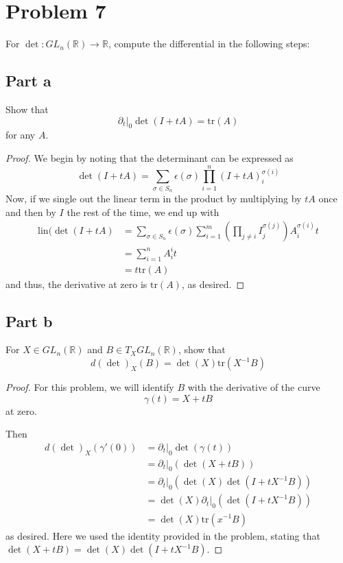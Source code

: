 \documentclass[fontsize=11pt]{scrartcl} %
\numberwithin{equation}{section} %
\numberwithin{figure}{section} %
\numberwithin{table}{section} %
\newcommand{\R}{\mathbb{R}}
\begin{document}
\newpage

\section*{Problem 7}
For $\det:GL_n(\R)\to\R$, compute the differential in the following steps:
\subsection*{Part a}
Show that
\[
    \partial_t|_0 \det(I+tA) = \textrm{tr}(A)
\]
for any $A$.
\\
\begin{proof}
We begin by noting that the determinant can be expressed as
    \[
        \det(I+tA) = \sum_{\sigma\in
        S_n}\epsilon(\sigma)\prod_{i=1}^{n}(I+tA)_i^{\sigma(i)}
    \]
    Now, if we single out the linear term in the product by multiplying by $tA$
    once and then by $I$ the rest of the time, we end up with
    \[
        \begin{aligned}
        \textrm{lin}(\det(I+tA) &= \sum_{\sigma\in S_n}
        \epsilon(\sigma)\sum_{i=1}^m(\prod_{j\neq
        i}I_j^{\sigma(j)})A_i^{\sigma(i)}t\\
            &= \sum_{i=1}^nA_i^it\\
            &=t\textrm{tr}(A)
        \end{aligned}
    \]
    and thus, the derivative at zero is $\textrm{tr}(A)$, as desired.
\end{proof}

\subsection*{Part b}
For $X\in GL_n(\R)$ and $B\in T_XGL_n(\R)$, show that
\[
    d(\det)_X(B) = \det(X)\textrm{tr}(X^{-1}B)
\]

\begin{proof}
For this problem, we will identify $B$ with the derivative of the curve
    \[
        \gamma(t) = X+tB
    \]
    at zero.

    Then
    \[
        \begin{aligned}
            d(\det)_X(\gamma'(0)) &= \partial_t|_0 \det(\gamma(t))\\
                            &= \partial_t|_0(\det(X+tB))\\
                            &= \partial_t|_0(\det(X)\det(I+tX^{-1}B))\\
                            &= \det(X)\partial_t|_0(\det(I+tX^{-1}B))\\
                            &= \det(X)\textrm{tr}(x^{-1}B)
        \end{aligned}
    \]  
    as desired. Here we used the identity provided in the problem, stating that
    $\det(X+tB) = \det(X)\det(I+tX^{-1}B)$.
\end{proof}
\end{document}
